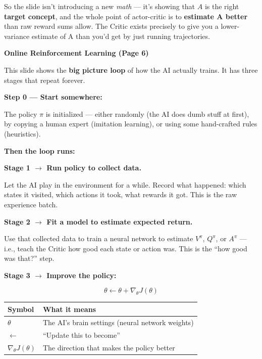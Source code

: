 So the slide isn't introducing a new \textit{math} --- it's showing that $A$ is the right \textbf{target concept}, and the whole point of actor-critic is to \textbf{estimate A better} than raw reward sums allow. The Critic exists precisely to give you a lower-variance estimate of A than you'd get by just running trajectories.

\bigskip


\textbf{Online Reinforcement Learning (Page 6)}

\medskip

This slide shows the \textbf{big picture loop} of how the AI actually trains. It has three stages that repeat forever.

\medskip

\textbf{Step 0 --- Start somewhere:}

The policy $\pi$ is initialized --- either randomly (the AI does dumb stuff at first), by copying a human expert (imitation learning), or using some hand-crafted rules (heuristics).

\medskip

\textbf{Then the loop runs:}

\textbf{Stage 1 $\to$ Run policy to collect data.}

Let the AI play in the environment for a while. Record what happened: which states it visited, which actions it took, what rewards it got. This is the raw experience batch.

\medskip

\textbf{Stage 2 $\to$ Fit a model to estimate expected return.}

Use that collected data to train a neural network to estimate $V^\pi$, $Q^\pi$, or $A^\pi$ --- i.e., teach the Critic how good each state or action was. This is the ``how good was that?'' step.

\medskip

\textbf{Stage 3 $\to$ Improve the policy:}

\[
\theta \leftarrow \theta + \nabla_\theta J(\theta)
\]

\begin{center}
\begin{tabular}{ll}
\hline
Symbol & What it means \\
\hline
$\theta$               & The AI's brain settings (neural network weights) \\
$\leftarrow$           & ``Update this to become'' \\
$\nabla_\theta J(\theta)$ & The direction that makes the policy better \\
\hline
\end{tabular}
\end{center}


